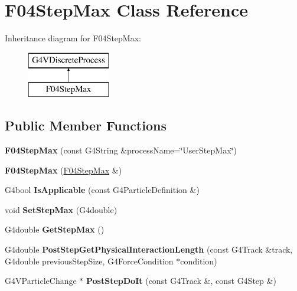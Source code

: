 \hypertarget{classF04StepMax}{\section{F04\-Step\-Max Class Reference}
\label{classF04StepMax}
}
Inheritance diagram for F04\-Step\-Max\-:\begin{figure}[H]
\begin{center}
\leavevmode
\includegraphics[height=2.000000cm]{classF04StepMax}
\end{center}
\end{figure}
\subsection*{Public Member Functions}
\begin{DoxyCompactItemize}
\item 
\hypertarget{classF04StepMax_a3a0e3aecc2103ec434993dd378651027}{{\bfseries F04\-Step\-Max} (const G4\-String \&process\-Name=\char`\"{}User\-Step\-Max\char`\"{})}\label{classF04StepMax_a3a0e3aecc2103ec434993dd378651027}

\item 
\hypertarget{classF04StepMax_ad02ad9bcc82ed66f0485fccbffb469df}{{\bfseries F04\-Step\-Max} (\hyperlink{classF04StepMax}{F04\-Step\-Max} \&)}\label{classF04StepMax_ad02ad9bcc82ed66f0485fccbffb469df}

\item 
\hypertarget{classF04StepMax_a16d37dfa479237ddc70abc022ea3c939}{G4bool {\bfseries Is\-Applicable} (const G4\-Particle\-Definition \&)}\label{classF04StepMax_a16d37dfa479237ddc70abc022ea3c939}

\item 
\hypertarget{classF04StepMax_a405dd2e0d98119ea57657ff2e49e1ba1}{void {\bfseries Set\-Step\-Max} (G4double)}\label{classF04StepMax_a405dd2e0d98119ea57657ff2e49e1ba1}

\item 
\hypertarget{classF04StepMax_a21dc6227ae46ff09e947142016081e45}{G4double {\bfseries Get\-Step\-Max} ()}\label{classF04StepMax_a21dc6227ae46ff09e947142016081e45}

\item 
\hypertarget{classF04StepMax_aa8cfb3146c37efa29e063d329b08986a}{G4double {\bfseries Post\-Step\-Get\-Physical\-Interaction\-Length} (const G4\-Track \&track, G4double previous\-Step\-Size, G4\-Force\-Condition $\ast$condition)}\label{classF04StepMax_aa8cfb3146c37efa29e063d329b08986a}

\item 
\hypertarget{classF04StepMax_a6291ed1451a20a9e691c72d2f59b6fbd}{G4\-V\-Particle\-Change $\ast$ {\bfseries Post\-Step\-Do\-It} (const G4\-Track \&, const G4\-Step \&)}\label{classF04StepMax_a6291ed1451a20a9e691c72d2f59b6fbd}

\end{DoxyCompactItemize}
